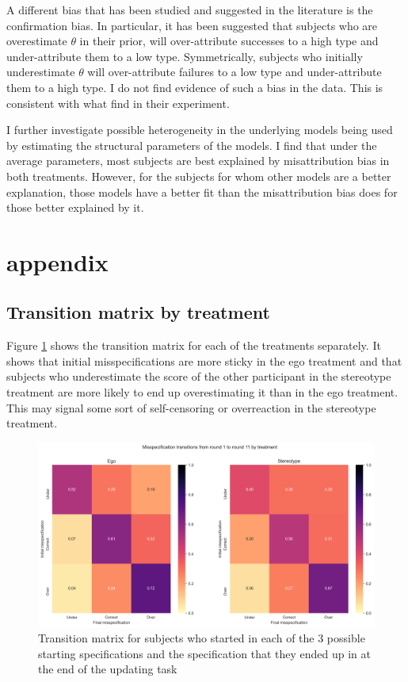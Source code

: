 \documentclass[
  12pt,
]{article}
\begin{document}
A different bias that has been studied and suggested in the literature
is the confirmation bias. In particular, it has been suggested that
subjects who are overestimate \(\theta\) in their prior, will
over-attribute successes to a high type and under-attribute them to a
low type. Symmetrically, subjects who initially underestimate \(\theta\)
will over-attribute failures to a low type and under-attribute them to a
high type. I do not find evidence of such a bias in the data. This is
consistent with what \citet{Mobius2022} find in their experiment.

I further investigate possible heterogeneity in the underlying models
being used by estimating the structural parameters of the models. I find
that under the average parameters, most subjects are best explained by
misattribution bias in both treatments. However, for the subjects for
whom other models are a better explanation, those models have a better
fit than the misattribution bias does for those better explained by it.

\newpage
\appendix

\hypertarget{appendix}{%
\section{appendix}\label{appendix}}

\hypertarget{transition-matrix-by-treatment}{%
\subsection{Transition matrix by
treatment}\label{transition-matrix-by-treatment}}

Figure \ref{fig:transitions-treatment} shows the transition matrix for
each of the treatments separately. It shows that initial
misspecifications are more sticky in the ego treatment and that subjects
who underestimate the score of the other participant in the stereotype
treatment are more likely to end up overestimating it than in the ego
treatment. This may signal some sort of self-censoring or overreaction
in the stereotype treatment.

\begin{figure}
\hypertarget{fig:transitions-treatment}{%
\centering
\includegraphics{../figures/misspecification_transitions_treatment.png}
\caption{Transition matrix for subjects who started in each of the 3
possible starting specifications and the specification that they ended
up in at the end of the updating task}\label{fig:transitions-treatment}
}
\end{figure}
\end{document}
